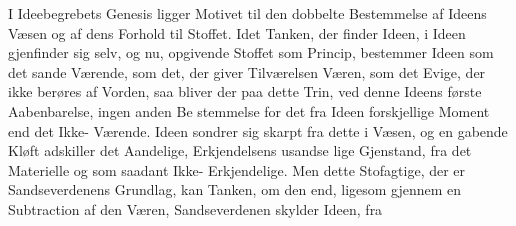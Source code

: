 \documentclass[12pt,a4paper]{book}
\newcommand{\gk}[1]{\textit{#1}}
\begin{document}
I Ideebegrebets Genesis ligger Motivet til den dobbelte
Bestemmelse af Ideens Væsen og af dens Forhold til Stoffet.
Idet Tanken, der finder Ideen, i Ideen gjenfinder sig selv, og
nu, opgivende Stoffet som Princip, bestemmer Ideen som det
sande Værende, som det, der giver Tilværelsen Væren, som
det Evige, der ikke berøres af Vorden, saa bliver der paa dette
Trin, ved denne Ideens første Aabenbarelse, ingen anden Be\-%
stemmelse for det fra Ideen forskjellige Moment end det Ikke-%
Værende. Ideen sondrer sig skarpt fra dette i Væsen, og en
gabende Kløft adskiller det Aandelige, Erkjendelsens usandse\-%
lige Gjenstand, fra det Materielle og som saadant Ikke-%
Erkjendelige. Men dette Stofagtige, der er Sandseverdenens
Grundlag, kan Tanken, om den end, ligesom gjennem en
Subtraction af den Væren, Sandseverdenen skylder Ideen, fra
\end{document}
